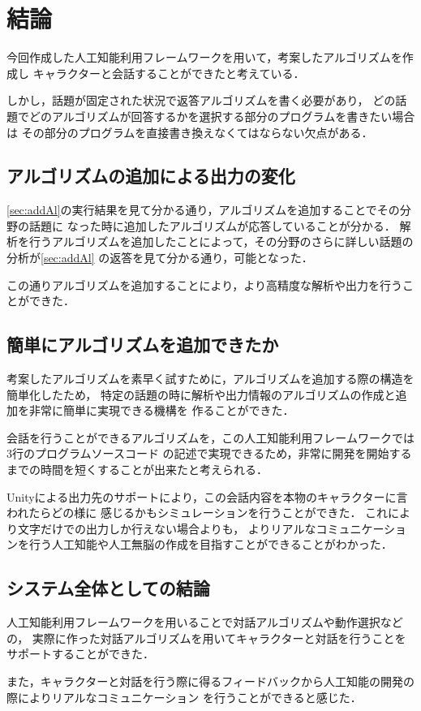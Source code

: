 \section{結論}
今回作成した人工知能利用フレームワークを用いて，考案したアルゴリズムを作成し
キャラクターと会話することができたと考えている．

しかし，話題が固定された状況で返答アルゴリズムを書く必要があり，
どの話題でどのアルゴリズムが回答するかを選択する部分のプログラムを書きたい場合は
その部分のプログラムを直接書き換えなくてはならない欠点がある．

\subsection{アルゴリズムの追加による出力の変化}
\ref{sec:addAl}の実行結果を見て分かる通り，アルゴリズムを追加することでその分野の話題に
なった時に追加したアルゴリズムが応答していることが分かる．
解析を行うアルゴリズムを追加したことによって，その分野のさらに詳しい話題の分析が\ref{sec:addAl}
の返答を見て分かる通り，可能となった．

この通りアルゴリズムを追加することにより，より高精度な解析や出力を行うことができた．

\subsection{簡単にアルゴリズムを追加できたか}
考案したアルゴリズムを素早く試すために，アルゴリズムを追加する際の構造を簡単化したため，
特定の話題の時に解析や出力情報のアルゴリズムの作成と追加を非常に簡単に実現できる機構を
作ることができた．

会話を行うことができるアルゴリズムを，この人工知能利用フレームワークでは3行のプログラムソースコード
の記述で実現できるため，非常に開発を開始するまでの時間を短くすることが出来たと考えられる．

Unityによる出力先のサポートにより，この会話内容を本物のキャラクターに言われたらどの様に
感じるかもシミュレーションを行うことができた．
これにより文字だけでの出力しか行えない場合よりも，
よりリアルなコミュニケーションを行う人工知能や人工無脳の作成を目指すことができることがわかった．

\subsection{システム全体としての結論}
人工知能利用フレームワークを用いることで対話アルゴリズムや動作選択などの，
実際に作った対話アルゴリズムを用いてキャラクターと対話を行うことをサポートすることができた．

また，キャラクターと対話を行う際に得るフィードバックから人工知能の開発の際によりリアルなコミュニケーション
を行うことができると感じた．